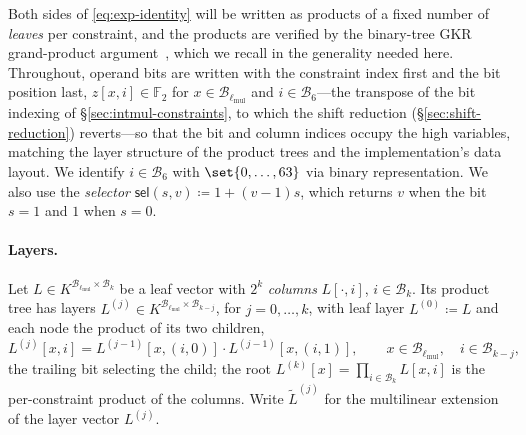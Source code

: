 \documentclass{article}
\theoremstyle{definition}
\newcommand*{\mle}{\widetilde}
\newcommand{\BB}{\mathcal{B}}
\newcommand{\FF}[1]{\mathbb{F}_{#1}}
\newcommand{\sel}{\textsf{sel}}
\begin{document}
Both sides of \eqref{eq:exp-identity} will be written as products of a fixed number of \emph{leaves} per constraint, and the products are verified by the binary-tree GKR grand-product argument~\cite{Thaler:2013aa}, which we recall in the generality needed here. Throughout, operand bits are written with the constraint index first and the bit position last, $z[x, i] \in \FF{2}$ for $x \in \BB_{\ell_\text{mul}}$ and $i \in \BB_6$---the transpose of the bit indexing of \S\ref{sec:intmul-constraints}, to which the shift reduction (\S\ref{sec:shift-reduction}) reverts---so that the bit and column indices occupy the high variables, matching the layer structure of the product trees and the implementation's data layout. We identify $i \in \BB_6$ with $\set{0, \ldots, 63}$ via binary representation. We also use the \emph{selector} $\sel(s, v) \coloneqq 1 + (v - 1) s$, which returns $v$ when the bit $s = 1$ and $1$ when $s = 0$.

\paragraph{Layers.}
Let $L \in K^{\BB_{\ell_\text{mul}} \times \BB_k}$ be a leaf vector with $2^k$ \emph{columns} $L[\cdot, i]$, $i \in \BB_k$. Its product tree has layers $L^{(j)} \in K^{\BB_{\ell_\text{mul}} \times \BB_{k - j}}$, for $j = 0, \ldots, k$, with leaf layer $L^{(0)} \coloneqq L$ and each node the product of its two children,
\[
  L^{(j)}[x, i] = L^{(j - 1)}[x, (i, 0)] \cdot L^{(j - 1)}[x, (i, 1)], \qquad x \in \BB_{\ell_\text{mul}}, \quad i \in \BB_{k - j},
\]
the trailing bit selecting the child; the root $L^{(k)}[x] = \prod_{i \in \BB_k} L[x, i]$ is the per-constraint product of the columns. Write $\mle{L}^{(j)}$ for the multilinear extension of the layer vector $L^{(j)}$.
\end{document}
